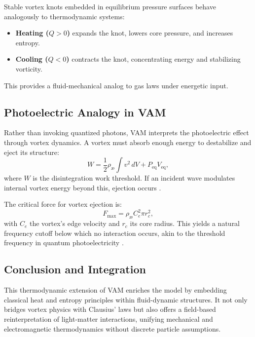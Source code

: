 Stable vortex knots embedded in equilibrium pressure surfaces behave analogously to thermodynamic systems:
\begin{itemize}
\item \textbf{Heating ($Q > 0$)} expands the knot, lowers core pressure, and increases entropy.
\item \textbf{Cooling ($Q < 0$)} contracts the knot, concentrating energy and stabilizing vorticity.
\end{itemize}
This provides a fluid-mechanical analog to gas laws under energetic input.

\subsection{Photoelectric Analogy in VAM}

Rather than invoking quantized photons, VAM interprets the photoelectric effect through vortex dynamics. A vortex must absorb enough energy to destabilize and eject its structure:
\begin{equation}
W = \frac{1}{2} \rho_{\text{\ae}} \int v^2 \, dV + P_{\text{eq}} V_{\text{eq}},
\end{equation}
where $W$ is the disintegration work threshold. If an incident wave modulates internal vortex energy beyond this, ejection occurs \cite{vam2025unified}.

The critical force for vortex ejection is:
\begin{equation}
F_{\text{max}} = \rho_{\text{\ae}} C_e^2 \pi r_c^2,
\end{equation}
with $C_e$ the vortex's edge velocity and $r_c$ its core radius. This yields a natural frequency cutoff below which no interaction occurs, akin to the threshold frequency in quantum photoelectricity \cite{einstein1905photoelectric}.

\subsection{Conclusion and Integration}

This thermodynamic extension of VAM enriches the model by embedding classical heat and entropy principles within fluid-dynamic structures. It not only bridges vortex physics with Clausius' laws but also offers a field-based reinterpretation of light-matter interactions, unifying mechanical and electromagnetic thermodynamics without discrete particle assumptions.







